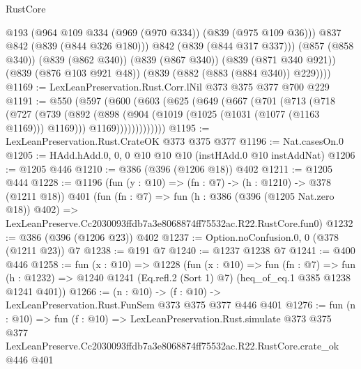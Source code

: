 \begin{lexlean}{RustCore}
\begin{coremodule}
            @193
            (@964 @109 @334 (@969 (@970 @334)) (@839 (@975 @109 @36)))
            @837
            @842
            (@839 (@844 @326 @180)))
          @842
          (@839 (@844 @317 @337)))
        (@857 (@858 @340))
        (@839 (@862 @340))
        (@839 (@867 @340))
        (@839 (@871 @340 @921))
        (@839 (@876 @103 @921 @48))
        (@839 (@882 (@883 (@884 @340)) @229))))
@1169 := LexLeanPreservation.Rust.Corr.lNil @373 @375 @377 @700 @229
@1191 := @550
    (@597
      (@600
        (@603
          (@625
            (@649
              (@667
                (@701
                  (@713
                    (@718
                      (@727
                        (@739
                          (@892
                            (@898
                              (@904 (@1019 (@1025 (@1031 (@1077 (@1163 @1169))) @1169)))
                              @1169)))))))))))))
@1195 := LexLeanPreservation.Rust.CrateOK @373 @375 @377
@1196 := Nat.casesOn.{0}
@1205 := HAdd.hAdd.{0, 0, 0} @10 @10 @10 (instHAdd.{0} @10 instAddNat)
@1206 := @1205 @446
@1210 := @386 (@396 (@1206 @18)) @402
@1211 := @1205 @444
@1228 := @1196
    (fun (y : @10) => (fn : @7) -> (h : @1210) -> @378 (@1211 @18))
    @401
    (fun (fn : @7) =>
    fun (h : @386 (@396 (@1205 Nat.zero @18)) @402) =>
    LexLeanPreserve.Cc2030093ffdb7a3e8068874ff75532ac.R22.RustCore.fun0)
@1232 := @386 (@396 (@1206 @23)) @402
@1237 := Option.noConfusion.{0, 0} (@378 (@1211 @23)) @7
@1238 := @191 @7
@1240 := @1237 @1238 @7
@1241 := @400 @446
@1258 := fun (x : @10) =>
  @1228
    (fun (x : @10) =>
    fun (fn : @7) =>
    fun (h : @1232) => @1240 @1241 (Eq.refl.{2} (Sort 1) @7) (heq_of_eq.{1} @385 @1238 @1241 @401))
@1266 := (n : @10) -> (f : @10) -> LexLeanPreservation.Rust.FunSem @373 @375 @377 @446 @401
@1276 := fun (n : @10) =>
  fun (f : @10) =>
  LexLeanPreservation.Rust.simulate
    @373
    @375
    @377
    LexLeanPreserve.Cc2030093ffdb7a3e8068874ff75532ac.R22.RustCore.crate_ok
    @446
    @401
\end{coremodule}
\end{lexlean}
